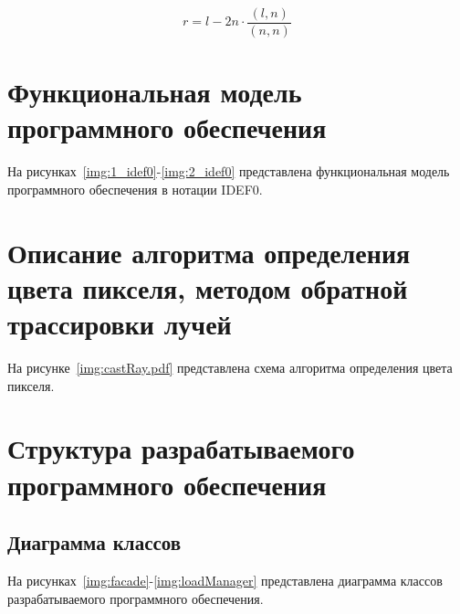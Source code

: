 \begin{equation}
	\label{reflect_ray}
	r = l - 2 n \cdot \frac{(l, n)}{(n, n)}
\end{equation}

\clearpage
\section{Функциональная модель программного обеспечения}
На рисунках~\ref{img:1_idef0}-\ref{img:2_idef0} представлена функциональная модель программного обеспечения в нотации IDEF0.

\FloatBarrier
{}
\FloatBarrier
{}
\FloatBarrier

\clearpage
\section{Описание алгоритма определения цвета пикселя, методом обратной трассировки лучей}
На рисунке~\ref{img:castRay.pdf} представлена схема алгоритма определения цвета пикселя.
\FloatBarrier
{}
\FloatBarrier


\clearpage
\section{Структура разрабатываемого программного обеспечения}
\subsection{Диаграмма классов}
На рисунках~\ref{img:facade}-\ref{img:loadManager} представлена диаграмма классов разрабатываемого программного обеспечения.
\FloatBarrier
{}
\FloatBarrier
{}
\FloatBarrier
{}
\FloatBarrier

